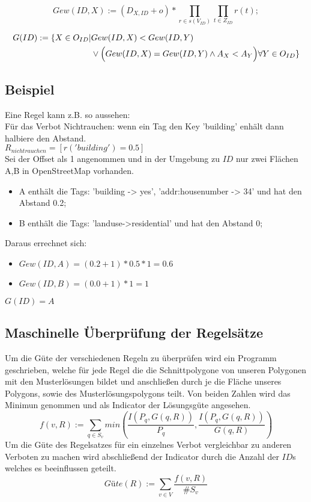 \begin{equation}
Gew(ID,X) := (D_{X,ID} + o) * \prod_{r \in s(V_{ID})} \prod_{t \in Z_{ID}} r(t);
\end{equation}

\begin{align}
G(ID) := \{X \in O_{ID} | & Gew(ID,X) < Gew(ID,Y)\\
& \lor \Big(Gew(ID,X)=Gew(ID,Y) \land A_X < A_Y\Big) \forall Y \in O_{ID}\} \notag
\end{align}

\subsection{Beispiel}
Eine Regel kann z.B. so aussehen:\\
Für das Verbot Nichtrauchen: wenn ein Tag den Key 'building' enhält dann halbiere den Abstand. \\
$R_{nichtrauchen} = [r('building') = 0.5]$\\
\newline
Sei der Offset als 1 angenommen und in der Umgebung zu $ID$ nur zwei
Flächen A,B in OpenStreetMap vorhanden.
\begin{itemize}
\item A enthält die Tags: 'building -> yes', 'addr:housenumber -> 34' und hat den Abstand 0.2;
\item B enthält die Tags: 'landuse->residential' und hat den Abstand 0;
\end{itemize}
Daraus errechnet sich:
\begin{itemize}
\item $Gew(ID,A) = (0.2 + 1) * 0.5 * 1 = 0.6$
\item $Gew(ID,B) = (0.0 + 1) * 1 = 1$
\end{itemize}

$G(ID) = A$

\subsection{Maschinelle Überprüfung der Regelsätze}
Um die Güte der verschiedenen Regeln zu überprüfen wird ein Programm geschrieben, welche für jede Regel die die Schnittpolygone von unseren Polygonen mit
den Musterlösungen bildet und anschließen durch je die Fläche unseres Polygons, sowie des Musterlösungspolygons teilt.
Von beiden Zahlen wird das Minimun genommen und als Indicator der Lösungsgüte angesehen.\\
\begin{equation}
f(v,R) := \sum_{q\in S_v} min(\frac{I(P_q,G(q,R))}{P_q},\frac{I(P_q,G(q,R))}{G(q,R)})
\end{equation}
Um die Güte des Regelsatzes für ein einzelnes Verbot vergleichbar zu anderen Verboten zu machen wird abschließend der Indicator durch
die Anzahl der $ID$s welches es beeinflussen geteilt.\\
\begin{equation}
\label{eq:guete}
Güte(R) := \sum_{v \in V} \frac{ f(v,R)}{\#S_v}
\end{equation}

